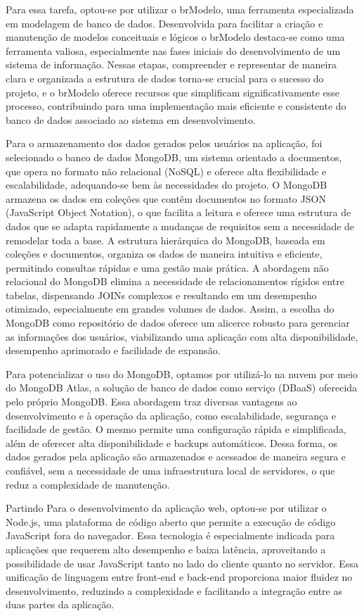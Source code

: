 Para essa tarefa, optou-se por utilizar o brModelo, uma ferramenta especializada em modelagem de banco de dados. Desenvolvida para facilitar a criação e manutenção de modelos conceituais e lógicos o brModelo destaca-se como uma ferramenta valiosa, especialmente nas fases iniciais do desenvolvimento de um sistema de informação. Nessas etapas, compreender e representar de maneira clara e organizada a estrutura de dados torna-se crucial para o sucesso do projeto, e o brModelo oferece recursos que simplificam significativamente esse processo, contribuindo para uma implementação mais eficiente e consistente do banco de dados associado ao sistema em desenvolvimento.


Para o armazenamento dos dados gerados pelos usuários na aplicação, foi selecionado o banco de dados MongoDB, um sistema orientado a documentos, que opera no formato não relacional (NoSQL) e oferece alta flexibilidade e escalabilidade, adequando-se bem às necessidades do projeto. O MongoDB armazena os dados em coleções que contêm documentos no formato JSON (JavaScript Object Notation), o que facilita a leitura e oferece uma estrutura de dados que se adapta rapidamente a mudanças de requisitos sem a necessidade de remodelar toda a base. A estrutura hierárquica do MongoDB, baseada em coleções e documentos, organiza os dados de maneira intuitiva e eficiente, permitindo consultas rápidas e uma gestão mais prática. A abordagem não relacional do MongoDB elimina a necessidade de relacionamentos rígidos entre tabelas, dispensando JOINs complexos e resultando em um desempenho otimizado, especialmente em grandes volumes de dados. Assim, a escolha do MongoDB como repositório de dados oferece um alicerce robusto para gerenciar as informações dos usuários, viabilizando uma aplicação com alta disponibilidade, desempenho aprimorado e facilidade de expansão.

Para potencializar o uso do MongoDB, optamos por utilizá-lo na nuvem por meio do MongoDB Atlas, a solução de banco de dados como serviço (DBaaS) oferecida pelo próprio MongoDB. Essa abordagem traz diversas vantagens ao desenvolvimento e à operação da aplicação, como escalabilidade, segurança e facilidade de gestão. O mesmo permite uma configuração rápida e simplificada, além de oferecer alta disponibilidade e backups automáticos. Dessa forma, os dados gerados pela aplicação são armazenados e acessados de maneira segura e confiável, sem a necessidade de uma infraestrutura local de servidores, o que reduz a complexidade de manutenção.

Partindo Para o desenvolvimento da aplicação web, optou-se por utilizar o Node.js, uma plataforma de código aberto que permite a execução de código JavaScript fora do navegador. Essa tecnologia é especialmente indicada para aplicações que requerem alto desempenho e baixa latência, aproveitando a possibilidade de usar JavaScript tanto no lado do cliente quanto no servidor. Essa unificação de linguagem entre front-end e back-end proporciona maior fluidez no desenvolvimento, reduzindo a complexidade e facilitando a integração entre as duas partes da aplicação.

